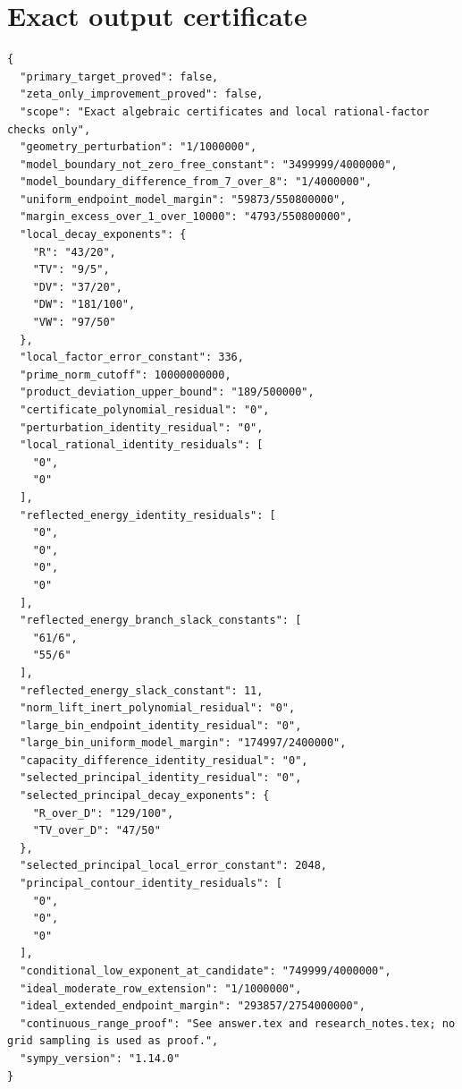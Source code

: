 \documentclass[12pt]{article}
\begin{document}
\section{Exact output certificate}
\begin{verbatim}
{
  "primary_target_proved": false,
  "zeta_only_improvement_proved": false,
  "scope": "Exact algebraic certificates and local rational-factor checks only",
  "geometry_perturbation": "1/1000000",
  "model_boundary_not_zero_free_constant": "3499999/4000000",
  "model_boundary_difference_from_7_over_8": "1/4000000",
  "uniform_endpoint_model_margin": "59873/550800000",
  "margin_excess_over_1_over_10000": "4793/550800000",
  "local_decay_exponents": {
    "R": "43/20",
    "TV": "9/5",
    "DV": "37/20",
    "DW": "181/100",
    "VW": "97/50"
  },
  "local_factor_error_constant": 336,
  "prime_norm_cutoff": 10000000000,
  "product_deviation_upper_bound": "189/500000",
  "certificate_polynomial_residual": "0",
  "perturbation_identity_residual": "0",
  "local_rational_identity_residuals": [
    "0",
    "0"
  ],
  "reflected_energy_identity_residuals": [
    "0",
    "0",
    "0",
    "0"
  ],
  "reflected_energy_branch_slack_constants": [
    "61/6",
    "55/6"
  ],
  "reflected_energy_slack_constant": 11,
  "norm_lift_inert_polynomial_residual": "0",
  "large_bin_endpoint_identity_residual": "0",
  "large_bin_uniform_model_margin": "174997/2400000",
  "capacity_difference_identity_residual": "0",
  "selected_principal_identity_residual": "0",
  "selected_principal_decay_exponents": {
    "R_over_D": "129/100",
    "TV_over_D": "47/50"
  },
  "selected_principal_local_error_constant": 2048,
  "principal_contour_identity_residuals": [
    "0",
    "0",
    "0"
  ],
  "conditional_low_exponent_at_candidate": "749999/4000000",
  "ideal_moderate_row_extension": "1/1000000",
  "ideal_extended_endpoint_margin": "293857/2754000000",
  "continuous_range_proof": "See answer.tex and research_notes.tex; no grid sampling is used as proof.",
  "sympy_version": "1.14.0"
}
\end{verbatim}
\end{document}
